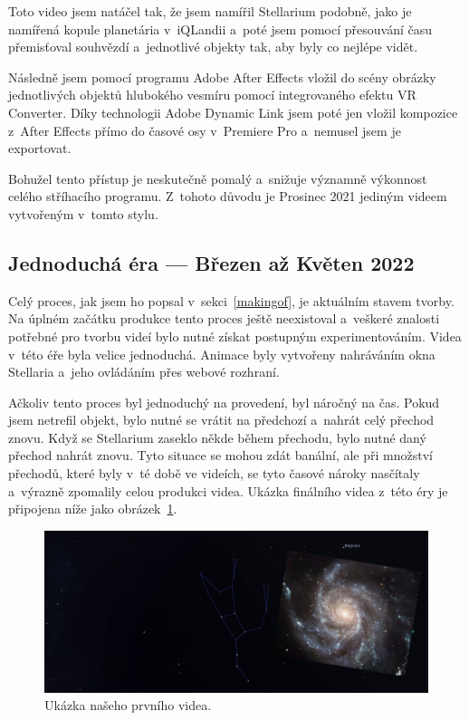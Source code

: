 \documentclass[12pt,a4paper,titlepage]{article}
\begin{document}
Toto video jsem natáčel tak, že jsem namířil Stellarium podobně, jako je namířená kopule planetária v~iQLandii a~poté jsem pomocí přesouvání času přemisťoval souhvězdí a~jednotlivé objekty tak, aby byly co nejlépe vidět. 

Následně jsem pomocí programu Adobe After Effects vložil do scény obrázky jednotlivých objektů hlubokého vesmíru pomocí integrovaného efektu VR Converter. Díky technologii Adobe Dynamic Link jsem poté jen vložil kompozice z~After Effects přímo do časové osy v~Premiere Pro a~nemusel jsem je exportovat. 

Bohužel tento přístup je neskutečně pomalý a~snižuje významně výkonnost celého stříhacího programu. Z~tohoto důvodu je Prosinec 2021 jediným videem vytvořeným v~tomto stylu.

\subsection{Jednoduchá éra --- Březen až Květen 2022}
Celý proces, jak jsem ho popsal v~sekci~\ref{makingof}, je aktuálním stavem tvorby. Na úplném začátku produkce tento proces ještě neexistoval a~veškeré znalosti potřebné pro tvorbu  videí bylo nutné získat postupným experimentováním. Videa v~této éře byla velice jednoduchá. Animace byly vytvořeny nahráváním okna Stellaria a~jeho ovládáním přes webové rozhraní.

Ačkoliv tento proces byl jednoduchý na provedení, byl náročný na čas. Pokud jsem netrefil objekt, bylo nutné se vrátit na předchozí a~nahrát celý přechod znovu. Když se Stellarium zaseklo někde během přechodu, bylo nutné daný přechod nahrát znovu. Tyto situace se mohou zdát banální, ale při množství přechodů, které byly v~té době ve videích, se tyto časové nároky nasčítaly a~výrazně zpomalily celou produkci videa. Ukázka finálního videa z~této éry je připojena níže jako obrázek~\ref{img:brezen}.

\begin{figure}[H]
	\centering
	\includegraphics[width=.85\textwidth]{brezen.png}
	\caption{Ukázka našeho prvního videa.}\label{img:brezen}
\end{figure}
\end{document}
